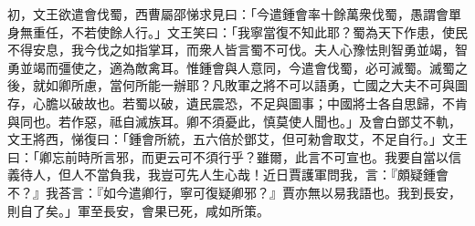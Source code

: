 \begin{pinyinscope}
 
初，文王欲遣會伐蜀，西曹屬邵悌求見曰：「今遣鍾會率十餘萬衆伐蜀，愚謂會單身無重任，不若使餘人行。」文王笑曰：「我寧當復不知此耶？蜀為天下作患，使民不得安息，我今伐之如指掌耳，而衆人皆言蜀不可伐。夫人心豫怯則智勇並竭，智勇並竭而彊使之，適為敵禽耳。惟鍾會與人意同，今遣會伐蜀，必可滅蜀。滅蜀之後，就如卿所慮，當何所能一辦耶？凡敗軍之將不可以語勇，亡國之大夫不可與圖存，心膽以破故也。若蜀以破，遺民震恐，不足與圖事；中國將士各自思歸，不肯與同也。若作惡，祗自滅族耳。卿不須憂此，慎莫使人聞也。」及會白鄧艾不軌，文王將西，悌復曰：「鍾會所統，五六倍於鄧艾，但可勑會取艾，不足自行。」文王曰：「卿忘前時所言邪，而更云可不須行乎？雖爾，此言不可宣也。我要自當以信義待人，但人不當負我，我豈可先人生心哉！近日賈護軍問我，言：『頗疑鍾會不？』我荅言：『如今遣卿行，寧可復疑卿邪？』賈亦無以易我語也。我到長安，則自了矣。」軍至長安，會果已死，咸如所策。
 

\end{pinyinscope}
